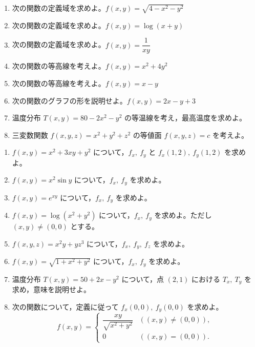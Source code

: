 \documentclass[dvipdfmx,a4paper,12pt]{jsarticle}
\newcommand{\subchap}[1]{\vspace{0.7em}{\large #1}\par\vspace{0.15em}}
\begin{document}
\subchap{A. 定義域・グラフ・等高線}

\begin{enumerate}[label=\arabic*.]
\item 次の関数の定義域を求めよ。$f(x,y)=\sqrt{4-x^2-y^2}$
\item 次の関数の定義域を求めよ。$f(x,y)=\log(x+y)$
\item 次の関数の定義域を求めよ。$f(x,y)=\dfrac{1}{xy}$
\item 次の関数の等高線を考えよ。$f(x,y)=x^2+4y^2$
\item 次の関数の等高線を考えよ。$f(x,y)=x-y$
\item 次の関数のグラフの形を説明せよ。$f(x,y)=2x-y+3$
\item 温度分布 $T(x,y)=80-2x^2-y^2$ の等温線を考え，最高温度を求めよ。
\item 三変数関数 $f(x,y,z)=x^2+y^2+z^2$ の等値面 $f(x,y,z)=c$ を考えよ。
\end{enumerate}

\subchap{B. 偏微分}

\begin{enumerate}[label=\arabic*.,start=9]
\item $f(x,y)=x^2+3xy+y^2$ について，$f_x,\ f_y$ と $f_x(1,2),\ f_y(1,2)$ を求めよ。
\item $f(x,y)=x^2\sin y$ について，$f_x,\ f_y$ を求めよ。
\item $f(x,y)=e^{xy}$ について，$f_x,\ f_y$ を求めよ。
\item $f(x,y)=\log(x^2+y^2)$ について，$f_x,\ f_y$ を求めよ。ただし $(x,y)\neq(0,0)$ とする。
\item $f(x,y,z)=x^2y+yz^3$ について，$f_x,\ f_y,\ f_z$ を求めよ。
\item $f(x,y)=\sqrt{1+x^2+y^2}$ について，$f_x,\ f_y$ を求めよ。
\item 温度分布 $T(x,y)=50+2x-y^2$ について，点 $(2,1)$ における $T_x,\ T_y$ を求め，意味を説明せよ。
\item 次の関数について，定義に従って $f_x(0,0),\ f_y(0,0)$ を求めよ。
$$
f(x,y)=
\begin{cases}
\dfrac{xy}{\sqrt{x^2+y^2}} & ((x,y)\neq(0,0)),\\[0.7em]
0 & ((x,y)=(0,0)).
\end{cases}
$$
\end{enumerate}

\subchap{C. 可微分性・全微分・接平面}
\end{document}
